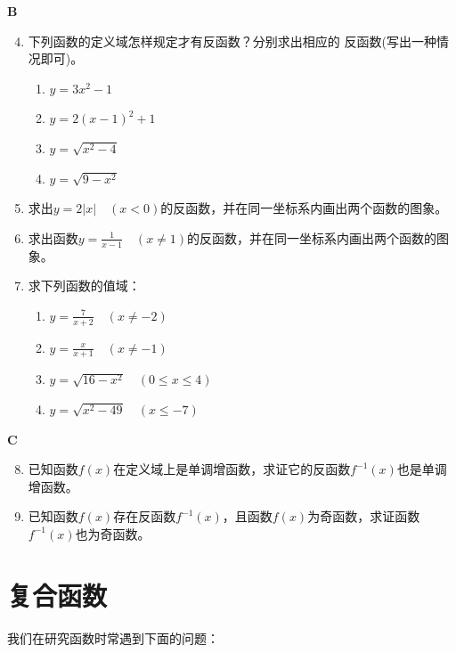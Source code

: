 \begin{center}
    \bfseries B
\end{center}
\begin{enumerate}\setcounter{enumi}{3}
    \item 下列函数的定义域怎样规定才有反函数？分别求出相应的
反函数(写出一种情况即可)。
\begin{multicols}{2}
\begin{enumerate}[(1)]
    \item $y= 3x^2- 1$ 
    \item $y= 2( x- 1) ^2+ 1 $
    \item $y= \sqrt{x^{2}- 4}$
    \item $y= \sqrt{9- x^{2}}$
\end{enumerate}
\end{multicols}
\item 求出$y=2|x|\quad (x<0)$的反函数，并在同一坐标系内画出两个函数的图象。
\item 求出函数$y=\frac{1}{x-1}\quad (x\ne 1)$的反函数，并在同一坐标系内画出两个函数的图象。
\item 求下列函数的值域：
\begin{multicols}{2}
\begin{enumerate}[(1)]
    \item $y=\frac{7}{x+2}\quad ( x\ne -2)$
    \item $y=\frac{x}{x+1}\quad (x\ne -1)$
    \item $y=\sqrt{16-x^2}\quad (0\le x\le 4)$
    \item $y=\sqrt{x^2-49}\quad (x\le -7)$
\end{enumerate}    
\end{multicols}
\end{enumerate}

\begin{center}
    \bfseries C
\end{center}

\begin{enumerate}\setcounter{enumi}{7}
    \item 已知函数$f(x)$在定义域上是单调增函数，求证它的反函数$f^{-1}(x)$也是单调增函数。
  \item   已知函数$f(x)$存在反函数$f^{-1}(x)$，且函数$f(x)$为奇函数，求证函数$f^{-1}(x)$也为奇函数。
\end{enumerate}

\section{复合函数}
我们在研究函数时常遇到下面的问题：


